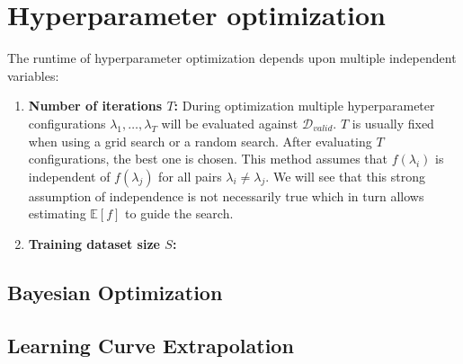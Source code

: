 
\chapter{Hyperparameter optimization}%
\label{sec:hyperparams}

The runtime of hyperparameter optimization depends upon multiple independent variables:
\begin{enumerate}
	\item \textbf{Number of iterations \(T\):}
		During optimization multiple hyperparameter configurations \(\lambda_1, \dots, \lambda_T\) will be evaluated against \(\mathcal{D}_{\mathit{valid}}\).
		\(T\) is usually fixed when using a grid search or a random search.
		After evaluating \(T\) configurations, the best one is chosen.
		This method assumes that \(f(\lambda_i)\) is independent of \(f(\lambda_j)\) for all pairs \(\lambda_i \neq \lambda_j\).
		We will see that this strong assumption of independence is not necessarily true which in turn allows estimating \(\mathbb{E}[f]\) to guide the search.
	\item \textbf{Training dataset size \(S\):}
\end{enumerate}

\section{Bayesian Optimization}%
\label{sec:hyperparams:fabolas}

\section{Learning Curve Extrapolation}%
\label{sec:hyperparams:earlyterm}
